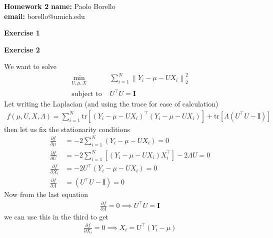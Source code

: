 \documentclass[10pt,notitlepage]{article}
\newcommand{\MBlue}[1]{{\color{MBlue}#1}}
\newcommand{\norm}[1]{\left\lVert #1\right\rVert}
\newcommand{\tr}[1]{\text{tr}\left[#1\right]}
\newcommand{\Id}{\mathbf{I}}
\begin{document}
	\begin{center}
		\huge{\MBlue{\textbf{Homework 2}}}		
		\vskip20pt
		\large{
			\textbf{name:} Paolo Borello\\
            \textbf{email:} borello@umich.edu}
	\end{center}

    \vskip20pt
    \noindent
    \textbf{\large \MBlue{Exercise 1}}
    \vskip10pt
    \noindent
	\begin{exercise}[Solution]
    \end{exercise}

    \newpage
    \textbf{\large \MBlue{Exercise 2}}
    \vskip10pt
    \noindent
	\begin{exercise}[Solution]
        We want to solve
        \begin{align*}
            \min_{U, \mu, X}& \sum_{i=1}^{N}\norm{Y_i - \mu - U X_i}_2^2\\
            \text{subject to }& U^\top U = \Id
        \end{align*}
        Let writing the Laplacian (and using the trace for ease of calculation)
        \begin{align*}
            f\left(\mu, U, X, \Lambda\right) = \sum_{i=1}^{N} \tr{\left(Y_i - \mu - U X_i\right)^\top \left(Y_i - \mu - U X_i\right)} + \tr{\Lambda\left(U^\top U -\Id\right)}
        \end{align*}
        then let us fix the stationarity conditions
        \begin{align*}
            \displaystyle\frac{\partial f}{\partial \mu} &= -2\sum_{i=1}^{N}\left(Y_i - \mu - U X_i\right)=0\\
            \displaystyle\frac{\partial f}{\partial U} &= -2\sum_{i=1}^{N}\left[\left(Y_i - \mu - U X_i\right)X_i^\top\right]-2\Lambda U=0\\
            \displaystyle\frac{\partial f}{\partial X_i} &= -2 U^\top \left(Y_i - \mu - U X_i\right)=0\\
            \displaystyle\frac{\partial f}{\partial \Lambda} &= \left(U^\top U -\Id\right)=0
        \end{align*}
        Now from the last equation
        \begin{align}\label{eqn:orth}
            \frac{\partial f}{\partial \Lambda}=0\implies U^\top U = \Id
        \end{align}
        we can use this in the third to get 
        \begin{align}\label{eqn:X}
            \frac{\partial f}{\partial X_i}=0\implies  X_i = U^\top\left(Y_i-\mu\right) 

\end{align}
\end{exercise}
\end{document}
